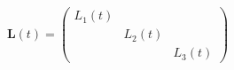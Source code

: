\begin{equation}
    \mathbf{L}(t) = \left(
    \begin{array}{ccc}
    L_1(t) && \\
    & L_2(t) &\\
    && L_3(t)
    \end{array}
    \right)
    \label{eq:uxo-L}
\end{equation}
